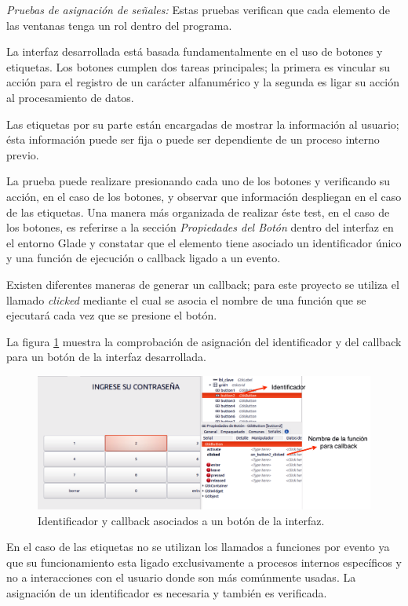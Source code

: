 \textit{Pruebas de asignación de señales:}  Estas pruebas verifican que cada elemento de las ventanas tenga un rol dentro del programa.

La interfaz desarrollada está basada fundamentalmente en el uso de botones y etiquetas. 
Los botones cumplen dos tareas principales; la primera es vincular su acción para el registro de un carácter alfanumérico y la segunda es ligar su acción al procesamiento de datos.

Las etiquetas por su parte están encargadas de mostrar la información al usuario; ésta información puede ser fija o puede ser dependiente de un proceso interno previo.

La prueba puede realizare presionando cada uno de los botones y verificando su acción, en el caso de los botones, y observar que información despliegan en el caso de las etiquetas. Una manera más organizada de realizar éste test, en el caso de los botones, es referirse a la sección \textit{Propiedades del Botón} dentro del interfaz en el entorno Glade y constatar que el elemento tiene asociado un identificador único y una función de ejecución o callback ligado a un evento.

Existen diferentes maneras de generar un callback; para este proyecto se utiliza el llamado \textit{clicked} mediante el cual se asocia el nombre de una función que se ejecutará cada vez que se presione el botón.

La figura \ref{fig:botonid} muestra la comprobación de asignación del identificador y del callback para un botón de la interfaz desarrollada.

\begin{figure}[H]
	\centering
	\includegraphics[scale=.22]{./Figures/botonid.pdf}
	\caption{Identificador y callback asociados a un botón de la interfaz.}
	\label{fig:botonid}
\end{figure}

En el caso de las etiquetas no se utilizan los llamados a funciones por evento ya que su funcionamiento esta ligado exclusivamente a procesos internos específicos y no a interacciones con el usuario donde son más comúnmente usadas. La asignación de un identificador es necesaria y también es verificada.


